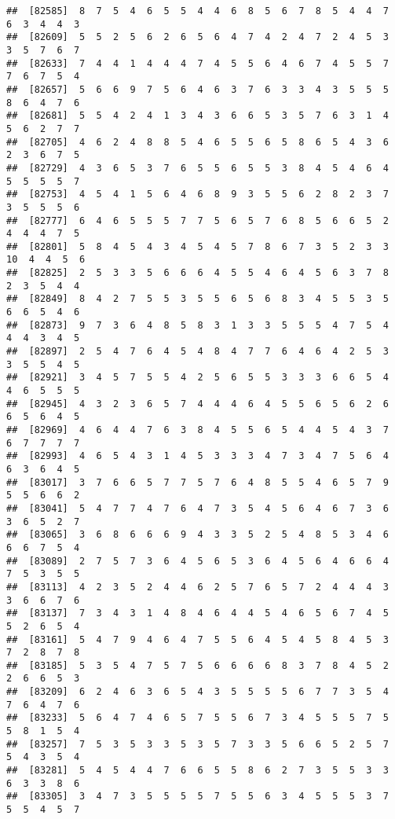 \documentclass[
]{book}
\begin{document}
\begin{verbatim}
##  [82585]  8  7  5  4  6  5  5  4  4  6  8  5  6  7  8  5  4  4  7  6  3  4  4  3
##  [82609]  5  5  2  5  6  2  6  5  6  4  7  4  2  4  7  2  4  5  3  3  5  7  6  7
##  [82633]  7  4  4  1  4  4  4  7  4  5  5  6  4  6  7  4  5  5  7  7  6  7  5  4
##  [82657]  5  6  6  9  7  5  6  4  6  3  7  6  3  3  4  3  5  5  5  8  6  4  7  6
##  [82681]  5  5  4  2  4  1  3  4  3  6  6  5  3  5  7  6  3  1  4  5  6  2  7  7
##  [82705]  4  6  2  4  8  8  5  4  6  5  5  6  5  8  6  5  4  3  6  2  3  6  7  5
##  [82729]  4  3  6  5  3  7  6  5  5  6  5  5  3  8  4  5  4  6  4  5  5  5  5  7
##  [82753]  4  5  4  1  5  6  4  6  8  9  3  5  5  6  2  8  2  3  7  3  5  5  5  6
##  [82777]  6  4  6  5  5  5  7  7  5  6  5  7  6  8  5  6  6  5  2  4  4  4  7  5
##  [82801]  5  8  4  5  4  3  4  5  4  5  7  8  6  7  3  5  2  3  3 10  4  4  5  6
##  [82825]  2  5  3  3  5  6  6  6  4  5  5  4  6  4  5  6  3  7  8  2  3  5  4  4
##  [82849]  8  4  2  7  5  5  3  5  5  6  5  6  8  3  4  5  5  3  5  6  6  5  4  6
##  [82873]  9  7  3  6  4  8  5  8  3  1  3  3  5  5  5  4  7  5  4  4  4  3  4  5
##  [82897]  2  5  4  7  6  4  5  4  8  4  7  7  6  4  6  4  2  5  3  3  5  5  4  5
##  [82921]  3  4  5  7  5  5  4  2  5  6  5  5  3  3  3  6  6  5  4  4  6  5  5  5
##  [82945]  4  3  2  3  6  5  7  4  4  4  6  4  5  5  6  5  6  2  6  6  5  6  4  5
##  [82969]  4  6  4  4  7  6  3  8  4  5  5  6  5  4  4  5  4  3  7  6  7  7  7  7
##  [82993]  4  6  5  4  3  1  4  5  3  3  3  4  7  3  4  7  5  6  4  6  3  6  4  5
##  [83017]  3  7  6  6  5  7  7  5  7  6  4  8  5  5  4  6  5  7  9  5  5  6  6  2
##  [83041]  5  4  7  7  4  7  6  4  7  3  5  4  5  6  4  6  7  3  6  3  6  5  2  7
##  [83065]  3  6  8  6  6  6  9  4  3  3  5  2  5  4  8  5  3  4  6  6  6  7  5  4
##  [83089]  2  7  5  7  3  6  4  5  6  5  3  6  4  5  6  4  6  6  4  7  5  3  5  5
##  [83113]  4  2  3  5  2  4  4  6  2  5  7  6  5  7  2  4  4  4  3  3  6  6  7  6
##  [83137]  7  3  4  3  1  4  8  4  6  4  4  5  4  6  5  6  7  4  5  5  2  6  5  4
##  [83161]  5  4  7  9  4  6  4  7  5  5  6  4  5  4  5  8  4  5  3  7  2  8  7  8
##  [83185]  5  3  5  4  7  5  7  5  6  6  6  6  8  3  7  8  4  5  2  2  6  6  5  3
##  [83209]  6  2  4  6  3  6  5  4  3  5  5  5  5  6  7  7  3  5  4  7  6  4  7  6
##  [83233]  5  6  4  7  4  6  5  7  5  5  6  7  3  4  5  5  5  7  5  5  8  1  5  4
##  [83257]  7  5  3  5  3  3  5  3  5  7  3  3  5  6  6  5  2  5  7  5  4  3  5  4
##  [83281]  5  4  5  4  4  7  6  6  5  5  8  6  2  7  3  5  5  3  3  6  3  3  8  6
##  [83305]  3  4  7  3  5  5  5  5  7  5  5  6  3  4  5  5  5  3  7  5  5  4  5  7

\end{verbatim}
\end{document}

